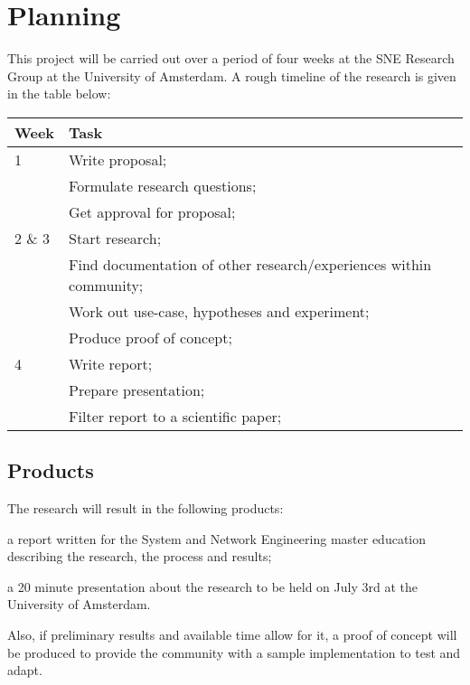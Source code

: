 \documentclass[oneside,twocolumn,8pt,a4paper]{article}
\begin{document}

	
	\section{Planning} %
	\label{sec:planning}
		This project will be carried out over a period of four weeks at the SNE Research Group at the University of Amsterdam. A rough timeline of the research is given in the table below: \\
		
		\begin{tabular}{l p{5.8cm}}
			Week & Task \\ \hline
				1 & Write proposal;\\
					& Formulate research questions; \\
					& Get approval for proposal; \\ \hline
				2 \& 3 & Start research; \\ 
					& Find documentation of other research/experiences within community; \\
					& Work out use-case, hypotheses and experiment; \\
				 	& Produce proof of concept; \\  \hline
				4 & Write report; \\ 
					& Prepare presentation; \\
					& Filter report to a scientific paper; \\
		\end{tabular}
		
		\subsection*{Products} %
		\label{sub:products}
			The research will result in the following products: 
			\begin{inparaenum}
				\item a report written for the System and Network Engineering master education describing the research, the process and results;
				\item a 20 minute presentation about the research to be held on July 3rd at the University of Amsterdam.
			\end{inparaenum}
			Also, if preliminary results and available time allow for it, a proof of concept will be produced to provide the community with a sample implementation to test and adapt.
	
	
	
	
\end{document}

